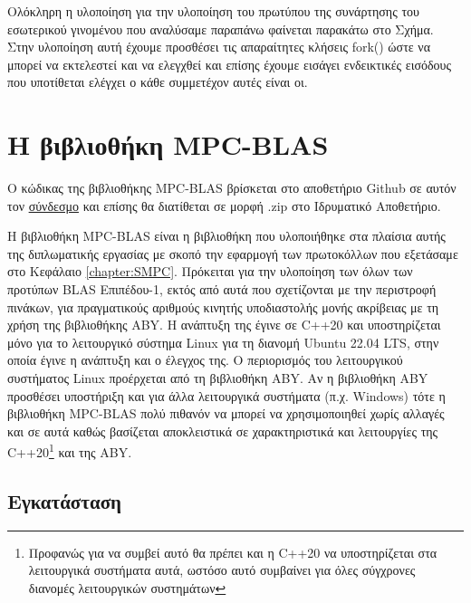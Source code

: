 Ολόκληρη η υλοποίηση για την υλοποίηση του πρωτύπου της συνάρτησης του εσωτερικού γινομένου που αναλύσαμε παραπάνω φαίνεται παρακάτω στο Σχήμα. Στην υλοποίηση αυτή έχουμε προσθέσει τις απαραίτητες κλήσεις fork() ώστε να μπορεί να εκτελεστεί και να ελεγχθεί και επίσης έχουμε εισάγει ενδεικτικές εισόδους που υποτίθεται ελέγχει ο κάθε συμμετέχον αυτές είναι οι.



\section{Η βιβλιοθήκη MPC-BLAS}

Ο κώδικας της βιβλιοθήκης MPC-BLAS βρίσκεται στο αποθετήριο Github σε αυτόν τον \href{https://github.com/st1064870/mpc-blas}{σύνδεσμο} και επίσης θα διατίθεται σε μορφή .zip στο Ιδρυματικό Αποθετήριο.

Η βιβλιοθήκη MPC-BLAS είναι η βιβλιοθήκη που υλοποιήθηκε στα πλαίσια αυτής της διπλωματικής εργασίας με σκοπό την εφαρμογή των πρωτοκόλλων που εξετάσαμε στο Κεφάλαιο \ref{chapter:SMPC}. Πρόκειται για την υλοποίηση των όλων των προτύπων BLAS Επιπέδου-1, εκτός από αυτά που σχετίζονται με την περιστροφή πινάκων, για πραγματικούς αριθμούς κινητής υποδιαστολής μονής ακρίβειας με τη χρήση της βιβλιοθήκης ABY. Η ανάπτυξη της έγινε σε C++20 και υποστηρίζεται μόνο για το λειτουργικό σύστημα Linux για τη διανομή Ubuntu 22.04 LTS, στην οποία έγινε η ανάπτυξη και ο έλεγχος της. Ο περιορισμός του λειτουργικού συστήματος Linux προέρχεται από τη βιβλιοθήκη ABY. Αν η βιβλιοθήκη ABY προσθέσει υποστήριξη και για άλλα λειτουργικά συστήματα (π.χ. Windows) τότε η βιβλιοθήκη MPC-BLAS πολύ πιθανόν να μπορεί να χρησιμοποιηθεί χωρίς αλλαγές και σε αυτά καθώς βασίζεται αποκλειστικά σε χαρακτηριστικά και λειτουργίες της C++20\footnote{Προφανώς για να συμβεί αυτό θα πρέπει και η C++20 να υποστηρίζεται στα λειτουργικά συστήματα αυτά, ωστόσο αυτό συμβαίνει για όλες σύγχρονες διανομές λειτουργικών συστημάτων} και της ABY.

\subsection{Εγκατάσταση}

